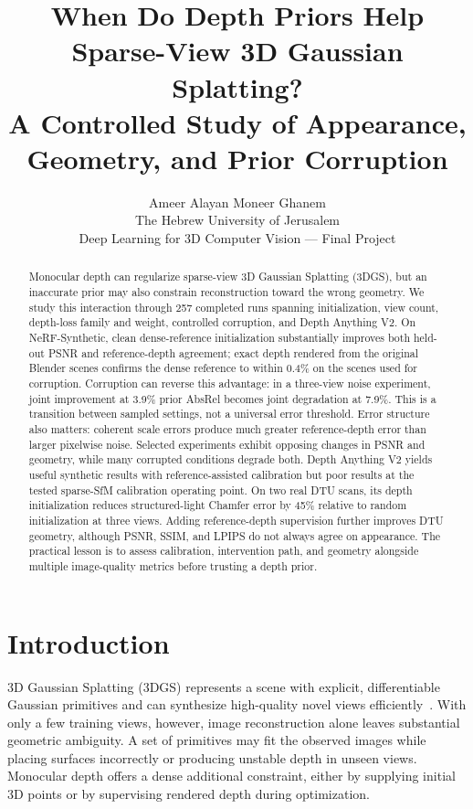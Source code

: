 \documentclass[10pt,a4paper]{article}
\title{When Do Depth Priors Help Sparse-View 3D Gaussian Splatting?\\[3pt]
\large A Controlled Study of Appearance, Geometry, and Prior Corruption}
\author{Ameer Alayan \qquad Moneer Ghanem\\[6pt]
\small The Hebrew University of Jerusalem\\
\small Deep Learning for 3D Computer Vision --- Final Project}
\date{}
\begin{document}
\maketitle

\begin{abstract}
Monocular depth can regularize sparse-view 3D Gaussian Splatting (3DGS), but an
inaccurate prior may also constrain reconstruction toward the wrong geometry. We
study this interaction through 257 completed runs spanning initialization, view
count, depth-loss family and weight, controlled corruption, and Depth Anything V2.
On NeRF-Synthetic, clean dense-reference initialization substantially improves both
held-out PSNR and reference-depth agreement; exact depth rendered from the original
Blender scenes confirms the dense reference to within 0.4\% on the scenes used for
corruption. Corruption can reverse this advantage: in a three-view noise experiment,
joint improvement at 3.9\% prior AbsRel becomes joint degradation at 7.9\%. This is
a transition between sampled settings, not a universal error threshold. Error
structure also matters: coherent scale errors produce much greater reference-depth
error than larger pixelwise noise. Selected experiments exhibit opposing changes in
PSNR and geometry, while many corrupted conditions degrade both. Depth Anything V2
yields useful synthetic results with reference-assisted calibration but poor results
at the tested sparse-SfM calibration operating point. On two real DTU scans, its
depth initialization reduces structured-light Chamfer error by 45\% relative to
random initialization at three views. Adding reference-depth supervision further
improves DTU geometry, although PSNR, SSIM, and LPIPS do not always agree on
appearance. The practical lesson is to assess calibration, intervention path, and
geometry alongside multiple image-quality metrics before trusting a depth prior.
\end{abstract}

\section{Introduction}

3D Gaussian Splatting (3DGS) represents a scene with explicit, differentiable
Gaussian primitives and can synthesize high-quality novel views
efficiently~\cite{kerbl2023}. With only a few training views, however, image
reconstruction alone leaves substantial geometric ambiguity. A set of primitives may
fit the observed images while placing surfaces incorrectly or producing unstable
depth in unseen views. Monocular depth offers a dense additional constraint, either
by supplying initial 3D points or by supervising rendered depth during optimization.
\end{document}
